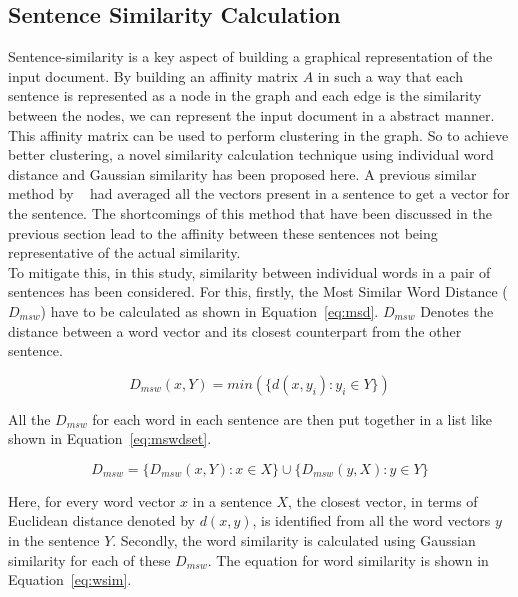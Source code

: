 \subsection{Sentence Similarity Calculation}\label{subsec:sentence-similarity-calculation}
Sentence-similarity is a key aspect of building a graphical representation of the input document. By building an affinity matrix $A$ in such a way that each sentence is represented as a node in the graph and each edge is the similarity between the nodes, we can represent the input document in a abstract manner. This affinity matrix can be used to perform clustering in the graph. So to achieve better clustering, a novel similarity calculation technique using individual word distance and Gaussian similarity has been proposed here. A previous similar method by \citeauthor{roychowdhury-etal-2022-spectral-base}~\cite{roychowdhury-etal-2022-spectral-base} had averaged all the vectors present in a sentence to get a vector for the sentence. The shortcomings of this method that have been discussed in the previous section lead to the affinity between these sentences not being representative of the actual similarity.\\

To mitigate this, in this study, similarity between individual words in a pair of sentences has been considered. For this, firstly, the Most Similar Word Distance ($D_{msw}$) have to be calculated as shown in Equation~\ref{eq:msd}. $D_{msw}$ Denotes the distance between a word vector and its closest counterpart from the other sentence.

\begin{equation}\label{eq:msd}
    D_{msw}(x,Y) = min(\{d(x,y_i) : y_i \in Y \})
\end{equation}

All the $D_{msw}$ for each word in each sentence are then put together in a list like shown in Equation~\ref{eq:mswdset}.

\begin{equation}
    D_{msw} = \{D_{msw}(x,Y) : x \in X\} \cup \{D_{msw}(y,X) : y \in Y\}
    \label{eq:mswdset}
\end{equation}

Here, for every word vector $x$ in a sentence $X$, the closest vector, in terms of Euclidean distance denoted by $d(x,y)$, is identified from all the word vectors $y$ in the sentence $Y$. Secondly, the word similarity is calculated using Gaussian similarity for each of these $D_{msw}$. The equation for word similarity is shown in Equation~\ref{eq:wsim}.

